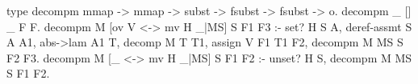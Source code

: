 \begin{elpicode}
  type decompm mmap -> mmap -> subst -> fsubst -> fsubst -> o.
  decompm _ [] _ F F.
  decompm M [ov V <-> mv H _|MS] S F1 F3 :- set? H S A,
    deref-assmt S A A1,
    abs->lam A1 T, decomp M T T1, 
    assign V F1 T1 F2,
    decompm M MS S F2 F3. 
  decompm M [_ <-> mv H _|MS] S F1 F2 :- unset? H S,
    decompm M MS S F1 F2.
\end{elpicode}
